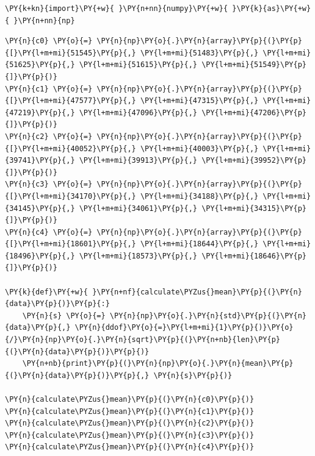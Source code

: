 
    
    \begin{tcolorbox}[breakable, size=fbox, boxrule=1pt, pad at break*=1mm,colback=cellbackground, colframe=cellborder]
\begin{Verbatim}[commandchars=\\\{\}]
\PY{k+kn}{import}\PY{+w}{ }\PY{n+nn}{numpy}\PY{+w}{ }\PY{k}{as}\PY{+w}{ }\PY{n+nn}{np}
\end{Verbatim}
\end{tcolorbox}

    \begin{tcolorbox}[breakable, size=fbox, boxrule=1pt, pad at break*=1mm,colback=cellbackground, colframe=cellborder]
\begin{Verbatim}[commandchars=\\\{\}]
\PY{n}{c0} \PY{o}{=} \PY{n}{np}\PY{o}{.}\PY{n}{array}\PY{p}{(}\PY{p}{[}\PY{l+m+mi}{51545}\PY{p}{,} \PY{l+m+mi}{51483}\PY{p}{,} \PY{l+m+mi}{51625}\PY{p}{,} \PY{l+m+mi}{51615}\PY{p}{,} \PY{l+m+mi}{51549}\PY{p}{]}\PY{p}{)}
\PY{n}{c1} \PY{o}{=} \PY{n}{np}\PY{o}{.}\PY{n}{array}\PY{p}{(}\PY{p}{[}\PY{l+m+mi}{47577}\PY{p}{,} \PY{l+m+mi}{47315}\PY{p}{,} \PY{l+m+mi}{47219}\PY{p}{,} \PY{l+m+mi}{47096}\PY{p}{,} \PY{l+m+mi}{47206}\PY{p}{]}\PY{p}{)}
\PY{n}{c2} \PY{o}{=} \PY{n}{np}\PY{o}{.}\PY{n}{array}\PY{p}{(}\PY{p}{[}\PY{l+m+mi}{40052}\PY{p}{,} \PY{l+m+mi}{40003}\PY{p}{,} \PY{l+m+mi}{39741}\PY{p}{,} \PY{l+m+mi}{39913}\PY{p}{,} \PY{l+m+mi}{39952}\PY{p}{]}\PY{p}{)}
\PY{n}{c3} \PY{o}{=} \PY{n}{np}\PY{o}{.}\PY{n}{array}\PY{p}{(}\PY{p}{[}\PY{l+m+mi}{34170}\PY{p}{,} \PY{l+m+mi}{34188}\PY{p}{,} \PY{l+m+mi}{34145}\PY{p}{,} \PY{l+m+mi}{34061}\PY{p}{,} \PY{l+m+mi}{34315}\PY{p}{]}\PY{p}{)}
\PY{n}{c4} \PY{o}{=} \PY{n}{np}\PY{o}{.}\PY{n}{array}\PY{p}{(}\PY{p}{[}\PY{l+m+mi}{18601}\PY{p}{,} \PY{l+m+mi}{18644}\PY{p}{,} \PY{l+m+mi}{18496}\PY{p}{,} \PY{l+m+mi}{18573}\PY{p}{,} \PY{l+m+mi}{18646}\PY{p}{]}\PY{p}{)}

\PY{k}{def}\PY{+w}{ }\PY{n+nf}{calculate\PYZus{}mean}\PY{p}{(}\PY{n}{data}\PY{p}{)}\PY{p}{:}
    \PY{n}{s} \PY{o}{=} \PY{n}{np}\PY{o}{.}\PY{n}{std}\PY{p}{(}\PY{n}{data}\PY{p}{,} \PY{n}{ddof}\PY{o}{=}\PY{l+m+mi}{1}\PY{p}{)}\PY{o}{/}\PY{n}{np}\PY{o}{.}\PY{n}{sqrt}\PY{p}{(}\PY{n+nb}{len}\PY{p}{(}\PY{n}{data}\PY{p}{)}\PY{p}{)}
    \PY{n+nb}{print}\PY{p}{(}\PY{n}{np}\PY{o}{.}\PY{n}{mean}\PY{p}{(}\PY{n}{data}\PY{p}{)}\PY{p}{,} \PY{n}{s}\PY{p}{)}
    
\PY{n}{calculate\PYZus{}mean}\PY{p}{(}\PY{n}{c0}\PY{p}{)}
\PY{n}{calculate\PYZus{}mean}\PY{p}{(}\PY{n}{c1}\PY{p}{)}
\PY{n}{calculate\PYZus{}mean}\PY{p}{(}\PY{n}{c2}\PY{p}{)}
\PY{n}{calculate\PYZus{}mean}\PY{p}{(}\PY{n}{c3}\PY{p}{)}
\PY{n}{calculate\PYZus{}mean}\PY{p}{(}\PY{n}{c4}\PY{p}{)}
\end{Verbatim}
\end{tcolorbox}


